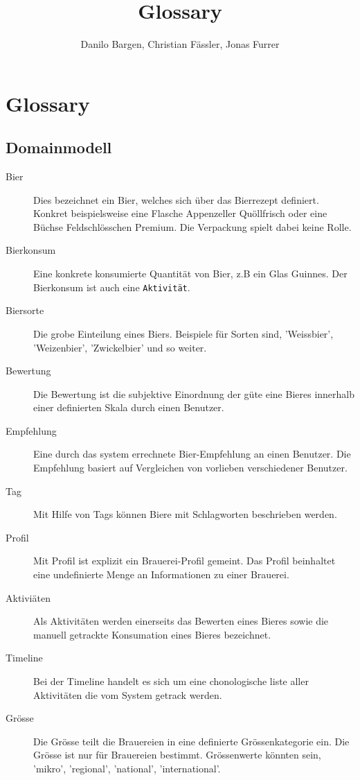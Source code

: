 \documentclass[10pt,a4paper]{scrartcl}
\author{Danilo Bargen, Christian Fässler, Jonas Furrer}
\title{Glossary}
\begin{document}
\begin{titlepage}
	\maketitle
	\vspace{120mm}
	\thispagestyle{empty} %
\end{titlepage}



\section{Glossary}
\subsection{Domainmodell}
\begin{description}
	\item[Bier] Dies bezeichnet ein Bier, welches sich über das Bierrezept definiert. Konkret beispielsweise eine Flasche Appenzeller Quöllfrisch oder eine Büchse Feldschlösschen Premium. Die Verpackung spielt dabei keine Rolle.
	\item[Bierkonsum] Eine konkrete konsumierte Quantität von Bier, z.B ein Glas Guinnes. Der Bierkonsum ist auch eine \texttt{Aktivität}.
	\item[Biersorte] Die grobe Einteilung eines Biers. Beispiele für Sorten sind, 'Weissbier', 'Weizenbier', 'Zwickelbier' und so weiter.
	\item[Bewertung] Die Bewertung ist die subjektive Einordnung der güte eine Bieres innerhalb einer definierten Skala durch einen Benutzer.
	\item[Empfehlung] Eine durch das system errechnete Bier-Empfehlung an einen Benutzer. Die Empfehlung basiert auf Vergleichen von vorlieben verschiedener Benutzer.
	\item[Tag] Mit Hilfe von Tags können Biere mit Schlagworten beschrieben werden.
	\item[Profil] Mit Profil ist explizit ein Brauerei-Profil gemeint. Das Profil beinhaltet eine undefinierte Menge an Informationen zu einer Brauerei.
	\item[Aktiviäten] Als Aktivitäten werden einerseits das Bewerten eines Bieres sowie die manuell getrackte Konsumation eines Bieres bezeichnet. 
	\item[Timeline] Bei der Timeline handelt es sich um eine chonologische liste aller Aktivitäten die vom System getrack werden.
	\item[Grösse] Die Grösse teilt die Brauereien in eine definierte Grössenkategorie ein. Die Grösse ist nur für Brauereien bestimmt. Grössenwerte könnten sein, 'mikro', 'regional', 'national', 'international'.
\end{description}
\end{document}
